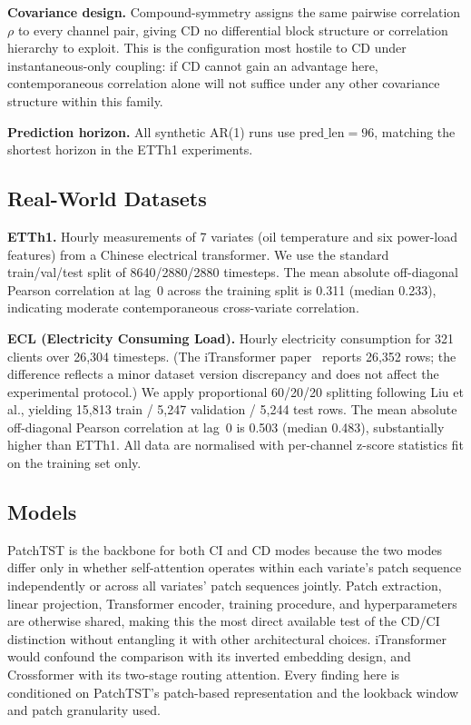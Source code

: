 \documentclass[10pt]{article} %
\begin{document}
    \textbf{Covariance design.} Compound-symmetry assigns the same pairwise correlation $\rho$ to every channel pair, giving
    CD no differential block structure or correlation hierarchy to exploit. This is the configuration most hostile to CD
    under instantaneous-only coupling: if CD cannot gain an advantage here, contemporaneous correlation alone will not
    suffice under any other covariance structure within this family.

    \textbf{Prediction horizon.} All synthetic AR(1) runs use $\text{pred\_len} = 96$, matching the shortest horizon in the
    ETTh1 experiments.

    \subsection{Real-World Datasets}

    \textbf{ETTh1.} Hourly measurements of 7 variates (oil temperature and six power-load features) from a Chinese
    electrical transformer. We use the standard train/val/test split of 8640/2880/2880 timesteps. The mean absolute
    off-diagonal Pearson correlation at lag~0 across the training split is 0.311 (median 0.233), indicating moderate
    contemporaneous cross-variate correlation.

    \textbf{ECL (Electricity Consuming Load).} Hourly electricity consumption for 321 clients over 26,304 timesteps. (The
    iTransformer paper~\citep{liu2024itransformer} reports 26,352 rows; the difference reflects a minor dataset version
    discrepancy and does not affect the experimental protocol.) We apply proportional 60/20/20 splitting following Liu et
    al., yielding 15,813 train / 5,247 validation / 5,244 test rows. The mean absolute off-diagonal Pearson correlation at
    lag~0 is 0.503 (median 0.483), substantially higher than ETTh1. All data are normalised with per-channel z-score
    statistics fit on the training set only.

    \subsection{Models}

    PatchTST is the backbone for both CI and CD modes because the two modes differ only in whether self-attention operates
    within each variate's patch sequence independently or across all variates' patch sequences jointly. Patch extraction,
    linear projection, Transformer encoder, training procedure, and hyperparameters are otherwise shared, making this the most
    direct available test of the CD/CI distinction without entangling it with other architectural choices. iTransformer would
    confound the comparison with its inverted embedding design, and Crossformer with its two-stage routing attention. Every
    finding here is conditioned on PatchTST's patch-based representation and the lookback window and patch granularity used.
\end{document}
